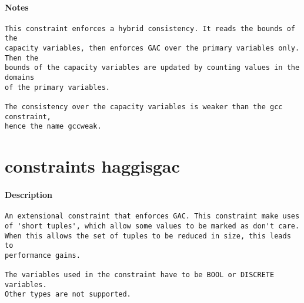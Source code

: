 \paragraph{Notes}
{\footnotesize
\begin{verbatim}
This constraint enforces a hybrid consistency. It reads the bounds of the
capacity variables, then enforces GAC over the primary variables only.  Then the
bounds of the capacity variables are updated by counting values in the domains
of the primary variables.

The consistency over the capacity variables is weaker than the gcc constraint,
hence the name gccweak.
\end{verbatim}
}
\section{constraints haggisgac}
\paragraph{Description}
{\footnotesize
\begin{verbatim}
An extensional constraint that enforces GAC. This constraint make uses
of 'short tuples', which allow some values to be marked as don't care.
When this allows the set of tuples to be reduced in size, this leads to
performance gains.

The variables used in the constraint have to be BOOL or DISCRETE variables.
Other types are not supported.
\end{verbatim}
}
